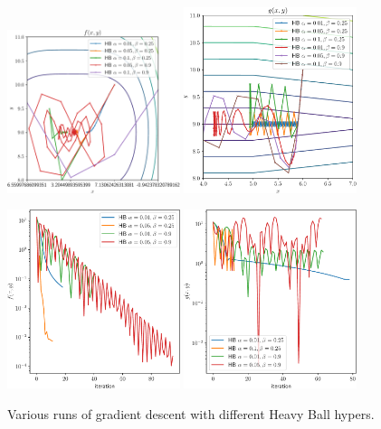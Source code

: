\begin{figure}
  \begin{center}
    \includegraphics[width=0.45\textwidth]{fig/heavy_ball-step-plot-f.pdf}
    \includegraphics[width=0.45\textwidth]{fig/heavy_ball-step-plot-g.pdf}

    \includegraphics[width=0.45\textwidth]{fig/heavy_ball-iterations-f.pdf}
    \includegraphics[width=0.45\textwidth]{fig/heavy_ball-iterations-g.pdf}
  \end{center}
  \caption{Various runs of gradient descent with different Heavy Ball hypers.}\label{fig:heavy_ball-step-plots}
\end{figure}


